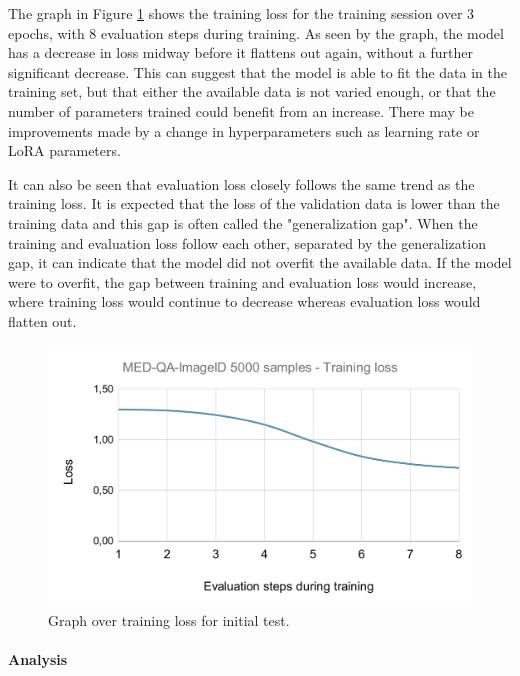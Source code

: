     The graph in Figure \ref{fig:MED-QA-ImageID_5000_samples-Training_loss} shows the training loss for the training session over 3 epochs, with 8 evaluation steps during training. As seen by the graph, the model has a decrease in loss midway before it flattens out again, without a further significant decrease. This can suggest that the model is able to fit the data in the training set, but that either the available data is not varied enough, or that the number of parameters trained could benefit from an increase. There may be improvements made by a change in hyperparameters such as learning rate or LoRA parameters.

    It can also be seen that evaluation loss closely follows the same trend as the training loss. It is expected that the loss of the validation data is lower than the training data and this gap is often called the "generalization gap". When the training and evaluation loss follow each other, separated by the generalization gap, it can indicate that the model did not overfit the available data. If the model were to overfit, the gap between training and evaluation loss would increase, where training loss would continue to decrease whereas evaluation loss would flatten out.
    
    \begin{figure}[htb]
        \centering
        \includegraphics[width=\linewidth]{images/MED-QA-ImageID_5000_samples-Training_loss.png}
        \caption{Graph over training loss for initial test.}
        \label{fig:MED-QA-ImageID_5000_samples-Training_loss}
    \end{figure} 


    \paragraph{Analysis\\}
    
